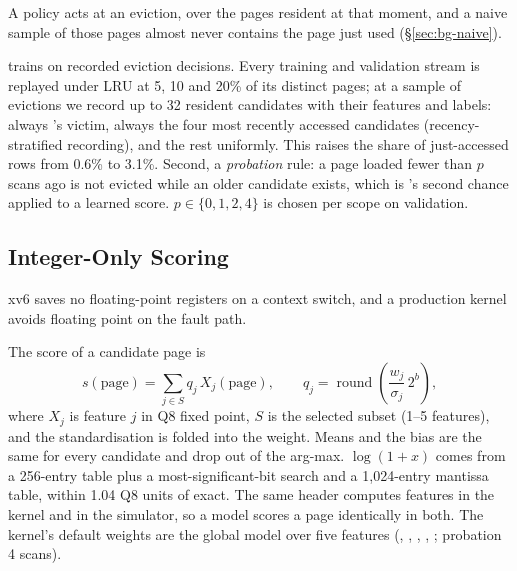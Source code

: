  A policy acts at an eviction, over the pages resident at that
moment, and a naive sample of those pages almost never contains the page just used
(\S\ref{sec:bg-naive}).

 \sys trains on recorded eviction decisions. Every training and
validation stream is replayed under LRU at 5, 10 and 20\% of its distinct pages; at a
sample of evictions we record up to 32 resident candidates with their features and
labels: always \belady's victim, always the four most recently accessed candidates
(recency-stratified recording), and the rest uniformly. This raises the share of
just-accessed rows from 0.6\% to 3.1\%. Second, a \emph{probation} rule: a page loaded
fewer than $p$ scans ago is not evicted while an older candidate exists, which is
\clock's second chance applied to a learned score. $p\in\{0,1,2,4\}$ is chosen per
scope on validation. 

\subsection{Integer-Only Scoring}
\label{sec:design-int}

 xv6 saves no floating-point registers on a context switch, and a
production kernel avoids floating point on the fault path.

 The score of a candidate page is
\begin{equation}
s(\text{page}) = \sum_{j\in S} q_j\, X_j(\text{page}), \qquad
q_j = \operatorname{round}\!\left(\frac{w_j}{\sigma_j}\, 2^{b}\right),
\label{eq:score}
\end{equation}
where $X_j$ is feature $j$ in Q8 fixed point, $S$ is the selected subset (1--5
features), and the standardisation is folded into the weight. Means and the bias are the
same for every candidate and drop out of the arg-max. $\log(1+x)$ comes from a 256-entry
table plus a most-significant-bit search and a 1,024-entry mantissa table, within 1.04
Q8 units of exact. The same header computes features in the kernel and in the
simulator, so a model scores a page identically in both. The kernel's default weights
are the global model over five features (, , ,
, ; probation 4 scans).

